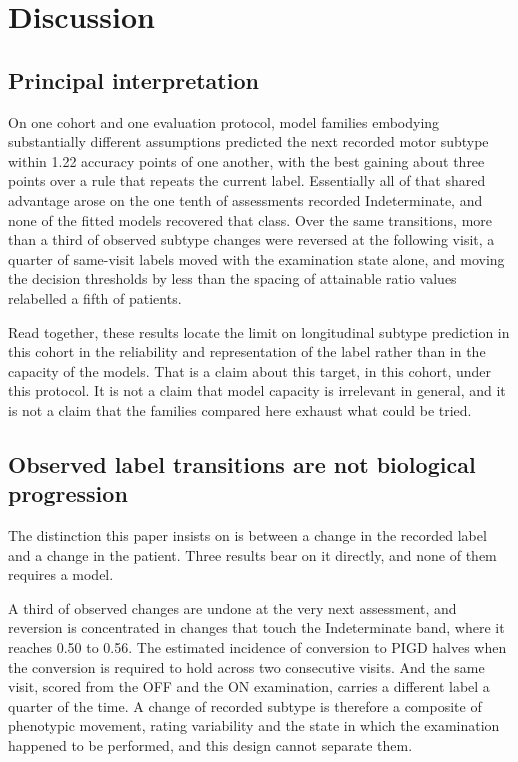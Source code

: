 \documentclass[11pt]{article}
\begin{document}
\section{Discussion}

\subsection{Principal interpretation}
On one cohort and one evaluation protocol, model families embodying substantially
different assumptions predicted the next recorded motor subtype within 1.22
accuracy points of one another, with the best gaining about three points over a
rule that repeats the current label. Essentially all of that shared advantage
arose on the one tenth of assessments recorded Indeterminate, and none of the
fitted models recovered that class. Over the same transitions, more than a third
of observed subtype changes were reversed at the following visit, a quarter of
same-visit labels moved with the examination state alone, and moving the decision
thresholds by less than the spacing of attainable ratio values relabelled a fifth
of patients.

Read together, these results locate the limit on longitudinal subtype prediction
in this cohort in the reliability and representation of the label rather than in
the capacity of the models. That is a claim about this target, in this cohort,
under this protocol. It is not a claim that model capacity is irrelevant in
general, and it is not a claim that the families compared here exhaust what could
be tried.

\subsection{Observed label transitions are not biological progression}
The distinction this paper insists on is between a change in the recorded label
and a change in the patient. Three results bear on it directly, and none of them
requires a model.

A third of observed changes are undone at the very next assessment, and reversion
is concentrated in changes that touch the Indeterminate band, where it reaches
0.50 to 0.56. The estimated incidence of conversion to PIGD halves when the
conversion is required to hold across two consecutive visits. And the same visit,
scored from the OFF and the ON examination, carries a different label a quarter of
the time. A change of recorded subtype is therefore a composite of phenotypic
movement, rating variability and the state in which the examination happened to
be performed, and this design cannot separate them.
\end{document}
